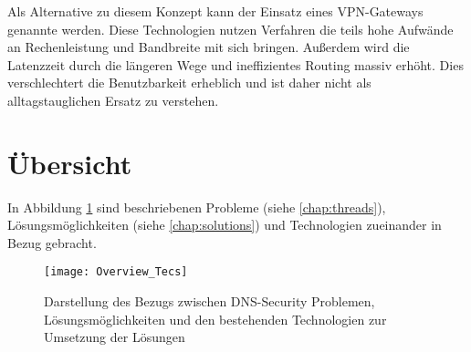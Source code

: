 Als Alternative zu diesem Konzept kann der Einsatz eines VPN-Gateways genannte werden. Diese Technologien nutzen Verfahren die teils hohe Aufwände an Rechenleistung und Bandbreite mit sich bringen. Außerdem wird die Latenzzeit durch die längeren Wege und ineffizientes Routing massiv erhöht. Dies verschlechtert die Benutzbarkeit erheblich und ist daher nicht als alltagstauglichen Ersatz zu verstehen.      

\section{Übersicht}
In Abbildung \ref{img:technologies-summary} sind beschriebenen Probleme (siehe \ref{chap:threads}), Lösungsmöglichkeiten (siehe \ref{chap:solutions}) und Technologien zueinander in Bezug gebracht.

\begin{figure}[!hb]
    \centering
    \texttt{[image: Overview\_Tecs]}
    \caption{Darstellung des Bezugs zwischen DNS-Security Problemen, Lösungsmöglichkeiten und den bestehenden Technologien zur Umsetzung der Lösungen}
    \label{img:technologies-summary}
\end{figure}